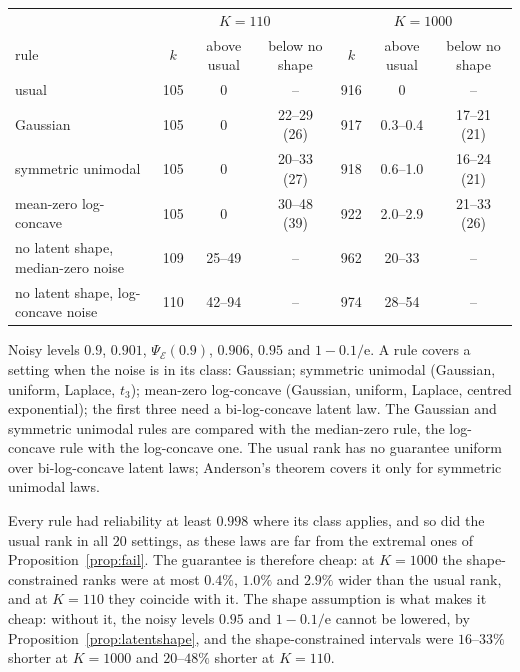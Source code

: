 \documentclass[lineno]{biometrika}
\begin{document}
\begin{table}
{\begin{tabular}{lcccccc}
 & \multicolumn{3}{c}{$K = 110$} & \multicolumn{3}{c}{$K = 1000$} \\
rule & $k$ & above usual & below no shape & $k$ & above usual & below no shape \\
usual & 105 & 0 & -- & 916 & 0 & -- \\
Gaussian & 105 & 0 & 22--29 (26) & 917 & 0.3--0.4 & 17--21 (21) \\
symmetric unimodal & 105 & 0 & 20--33 (27) & 918 & 0.6--1.0 & 16--24 (21) \\
mean-zero log-concave & 105 & 0 & 30--48 (39) & 922 & 2.0--2.9 & 21--33 (26) \\
no latent shape, median-zero noise & 109 & 25--49 & -- & 962 & 20--33 & -- \\
no latent shape, log-concave noise & 110 & 42--94 & -- & 974 & 28--54 & -- \\
\end{tabular}}
\label{tab:sameinfo}
\begin{tabnote}
Noisy levels $0.9$, $0.901$, $\Psi_{\mathcal E}(0.9)$, $0.906$, $0.95$ and $1 - 0.1/\mathrm{e}$. A rule covers a setting when the noise is in its class: Gaussian; symmetric unimodal (Gaussian, uniform, Laplace, $t_3$); mean-zero log-concave (Gaussian, uniform, Laplace, centred exponential); the first three need a bi-log-concave latent law. The Gaussian and symmetric unimodal rules are compared with the median-zero rule, the log-concave rule with the log-concave one. The usual rank has no guarantee uniform over bi-log-concave latent laws; Anderson's theorem covers it only for symmetric unimodal laws.
\end{tabnote}
\end{table}

Every rule had reliability at least $0.998$ where its class applies, and so did the usual rank in all $20$ settings, as these laws are far from the extremal ones of Proposition~\ref{prop:fail}. The guarantee is therefore cheap: at $K = 1000$ the shape-constrained ranks were at most $0.4\%$, $1.0\%$ and $2.9\%$ wider than the usual rank, and at $K = 110$ they coincide with it. The shape assumption is what makes it cheap: without it, the noisy levels $0.95$ and $1 - 0.1/\mathrm{e}$ cannot be lowered, by Proposition~\ref{prop:latentshape}, and the shape-constrained intervals were $16$--$33\%$ shorter at $K = 1000$ and $20$--$48\%$ shorter at $K = 110$.
\end{document}
